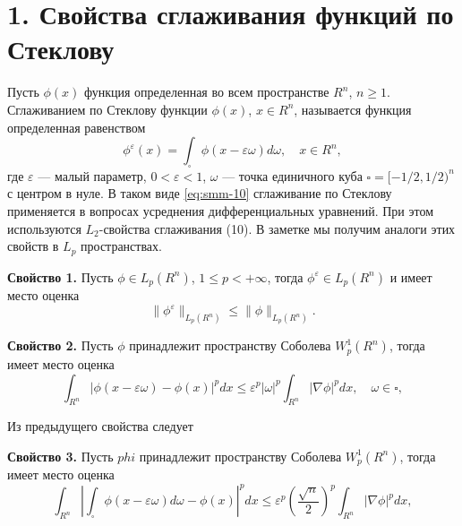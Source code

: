 \section*{1. Свойства сглаживания функций по Стеклову}
Пусть $\phi(x)$ функция определенная во всем пространстве  $R^n$, $n\geqslant1$. Сглаживанием по Стеклову функции $\phi(x)$, $x\in R^n$, называется функция определенная равенством
\begin{equation}\label{eq:smm-10}
\phi^\varepsilon (x)=\int_\square \phi(x-\varepsilon \omega)d\omega, \quad   x\in R^n, 
\end{equation}                
где  $\varepsilon$ --- малый параметр,  $0<\varepsilon<1$, $\omega$ --- точка единичного куба $\square=[-1/2,1/2)^n$ с центром в нуле.
В таком виде \eqref{eq:smm-10} сглаживание по Стеклову применяется в вопросах усреднения дифференциальных уравнений. При этом используются $L_2$-свойства сглаживания (10). В заметке мы получим аналоги этих свойств в  $L_p$ пространствах.

\textbf{Свойство 1.} Пусть  $\phi\in L_p (R^n)$, $1\leqslant p<+\infty$, тогда 
$\phi^\varepsilon\in L_p (R^n)$ и имеет место оценка
$$
\|\phi^\varepsilon\|_{L_p (R^n )} \leqslant\|\phi\|_{L_p (R^n)}.    
$$

\textbf{Свойство 2.} Пусть $\phi$ принадлежит пространству Соболева $W_p^1 (R^n)$, тогда имеет место оценка
$$
\int_{R^n}|\phi(x-\varepsilon\omega)-\phi(x)|^p  dx \leqslant \varepsilon^p |\omega|^p  \int_{R^n}|\nabla \phi|^p dx,   \quad \omega\in\square,        
$$


Из предыдущего свойства следует

\textbf{Свойство 3.} Пусть $phi$ принадлежит пространству Соболева $W_p^1 (R^n)$, тогда имеет место оценка
$$
\int_{R^n}\left|\int_\square\phi(x-\varepsilon\omega)d\omega-\phi(x)\right|^p  dx \leqslant \varepsilon^p \left(\frac{\sqrt{n}}{2}\right)^p  \int_{R^n}|\nabla \phi|^p dx,         
$$



